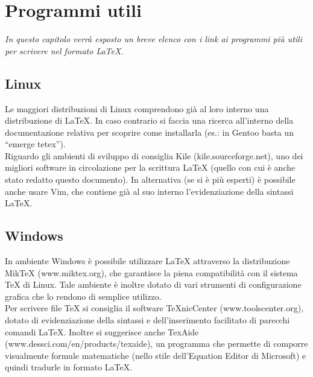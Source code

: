 \chapter{Programmi utili}

\begin{minipage}{12cm}\textit{In questo capitolo verr\`a esposto un breve elenco con i link ai programmi pi\`u utili per scrivere nel formato LaTeX.}
\end{minipage}

\vspace*{1cm}

\section{Linux}

Le maggiori distribuzioni di Linux comprendono gi\`a al loro interno una distribuzione di LaTeX. In caso contrario si faccia una ricerca all'interno della documentazione relativa per scoprire come installarla (es.: in Gentoo basta un ``emerge tetex'').\\

Riguardo gli ambienti di sviluppo di consiglia Kile (kile.sourceforge.net), uno dei migliori software in circolazione per la scrittura LaTeX (quello con cui \`e anche stato redatto questo documento). In alternativa (se si \`e pi\`u esperti) \`e possibile anche usare Vim, che contiene gi\`a al suo interno l'evidenziazione della sintassi LaTeX.


\section{Windows}

In ambiente Windows \`e possibile utilizzare LaTeX attraverso la distribuzione MikTeX (www.miktex.org), che garantisce la piena compatibilit\`a con il sistema TeX di Linux. Tale ambiente \`e inoltre dotato di vari strumenti di configurazione grafica che lo rendono di semplice utilizzo.\\

Per scrivere file TeX si consiglia il software TeXnicCenter (www.toolscenter.org), dotato di evidenziazione della sintassi e dell'inserimento facilitato di parecchi comandi LaTeX. Inoltre si suggerisce anche TexAide (www.dessci.com/en/products/texaide), un programma che permette di comporre visualmente formule matematiche (nello stile dell'Equation Editor di Microsoft) e quindi tradurle in formato LaTeX.